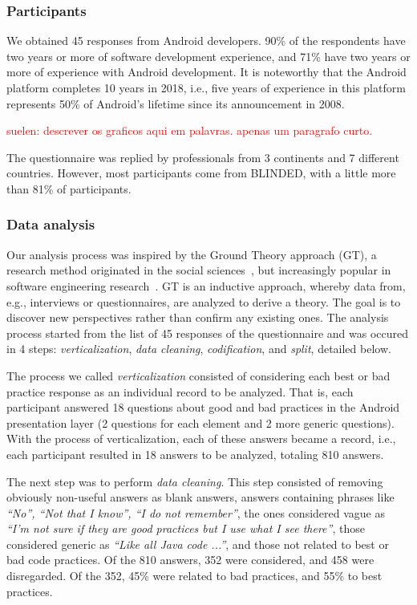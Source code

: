 \subsubsection{Participants}
\label{etapa-1-participantes}

We obtained 45 responses from Android developers. 
90\% of the respondents have two years or more of software development experience, 
and 71\% have two years or more of experience with Android development. 
It is noteworthy that the Android platform completes 10 years in 2018, i.e., 
five years of experience in this platform represents 50\% of Android's lifetime
since its announcement in 2008.

\textcolor{red}{suelen: descrever os graficos aqui em palavras. apenas um paragrafo curto.}

The questionnaire was replied by professionals from 3 continents and 7 different countries.
However, most participants come from BLINDED, with a little more than 81\% of participants.

\subsubsection{Data analysis}
\label{etapa-1-analise}

Our analysis process was inspired by the Ground Theory approach (GT), a research method originated in the social sciences~\cite{Strauss2007, GlaserStrauss1999}, but increasingly popular in software engineering research~\cite{Adolph2011}. 
GT is an inductive approach, whereby data from, e.g., interviews or questionnaires, are analyzed to derive a theory. The goal is to discover new perspectives rather than confirm any existing ones. The analysis process started from the list of 45 responses of the questionnaire and was occured in 4 steps: \textit{verticalization}, \textit {data cleaning}, \textit {codification}, and \textit {split}, detailed below.

The process we called \textit{verticalization} consisted of considering each best or bad practice response as an individual record to be analyzed. That is, each participant answered 18 questions about good and bad practices in the Android presentation layer (2 questions for each element and 2 more generic questions). With the process of verticalization, each of these answers became a record, i.e., each participant resulted in 18 answers to be analyzed, totaling 810 answers.

The next step was to perform \textit{data cleaning}. This step consisted of removing obviously non-useful answers as blank answers, answers containing phrases like \textit{``No'', ``Not that I know'', ``I do not remember''}, the ones considered vague as \textit{``I'm not sure if they are good practices but I use what I see there''}, those considered generic as \textit{``Like all Java code ...''}, and those not related to best or bad code practices. Of the 810 answers, 352 were considered, and 458 were disregarded. Of the 352, 45\% were related to bad practices, and 55\% to best practices.

